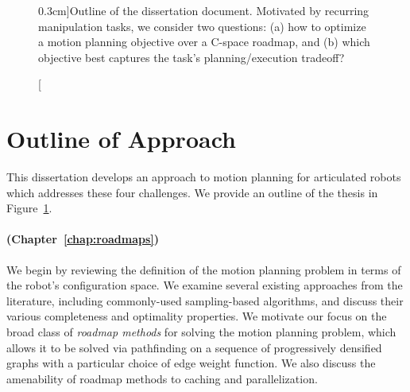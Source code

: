 \begin{figure}[t]
   \caption[][0.3cm]{Outline of the dissertation document.
      Motivated by recurring manipulation tasks,
      we consider two questions:
      (a) how to optimize a motion planning objective
      over a C-space roadmap,
      and (b) which objective best captures
      the task's planning/execution tradeoff?}

   \label{fig:intro:outline}
\end{figure}

\section{Outline of Approach}

This dissertation develops an approach to motion planning
for articulated robots
which addresses these four challenges.
We provide an outline of the thesis in Figure~\ref{fig:intro:outline}.

\paragraph{ (Chapter~\ref{chap:roadmaps})}
We begin by reviewing the definition of the motion planning problem
in terms of the robot's configuration space.
We examine several existing approaches from the literature,
including commonly-used sampling-based algorithms,
and discuss their various completeness and optimality properties.
We motivate our focus on the broad class of \emph{roadmap methods}
for solving the motion planning problem,
which allows it to be solved via pathfinding on a sequence of
progressively densified graphs
with a particular choice of edge weight function.
We also discuss the amenability of roadmap methods
to caching and parallelization.

